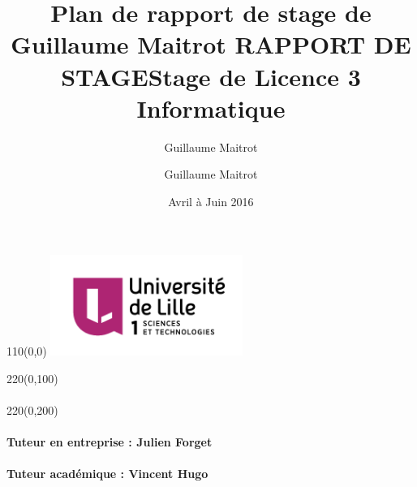 \documentclass[a4paper]{article}
\title{Plan de rapport de stage de Guillaume Maitrot }
\author{Guillaume Maitrot}
\begin{document}
\begin{titlepage}

\begin{textblock}{110}(0,0)
\includegraphics[width=0.47\textwidth]{38040_logo-trans.png}

\end{textblock}




\begin{textblock}{220}(0,100)
\centering
\title{RAPPORT DE STAGE}
\author{Guillaume Maitrot}
\date{Avril à Juin 2016}
\maketitle
\title{Stage de Licence 3 Informatique}
\maketitle
\paragraph{}
\end{textblock}


\centering
\begin{textblock}{220}(0,200)
\paragraph{Tuteur en entreprise : Julien Forget}
\paragraph{Tuteur académique : Vincent Hugo }

\end{textblock}
\end{titlepage}
\end{document}
